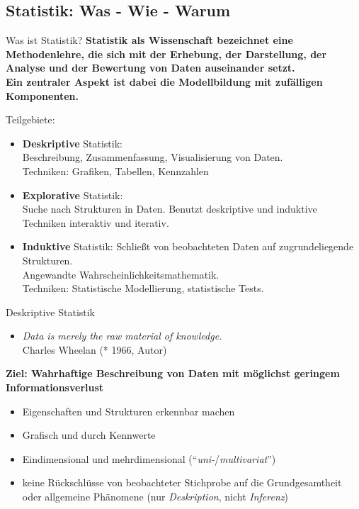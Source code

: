 \documentclass[
  10pt,
  ignorenonframetext,
]{beamer}
\providecommand{\tightlist}{%
  \setlength{\itemsep}{0pt}\setlength{\parskip}{0pt}}
\begin{document}
\subsection{Statistik: Was - Wie -
Warum}\label{statistik-was---wie---warum}

\begin{frame}{Was ist Statistik?}
\label{was-ist-statistik}
\textbf{Statistik als Wissenschaft bezeichnet eine Methodenlehre, die
sich mit der Erhebung, der Darstellung, der Analyse und der Bewertung
von Daten auseinander setzt.\\
Ein zentraler Aspekt ist dabei die Modellbildung mit zufälligen
Komponenten.}

Teilgebiete:

\begin{itemize}
\item
  \textbf{Deskriptive} Statistik:\\
  Beschreibung, Zusammenfassung, Visualisierung von Daten.\\
  Techniken: Grafiken, Tabellen, Kennzahlen
\item
  \textbf{Explorative} Statistik:\\
  Suche nach Strukturen in Daten. Benutzt deskriptive und induktive
  Techniken interaktiv und iterativ.
\item
  \textbf{Induktive} Statistik: Schließt von beobachteten Daten auf
  zugrundeliegende Strukturen.\\
  Angewandte Wahrscheinlichkeitsmathematik.\\
  Techniken: Statistische Modellierung, statistische Tests.
\end{itemize}
\end{frame}

\begin{frame}{Deskriptive Statistik}
\label{deskriptive-statistik}
\begin{itemize}[<+->]
\tightlist
\item
  \emph{Data is merely the raw material of knowledge.}\\
  Charles Wheelan (* 1966, Autor)
\end{itemize}

\textbf{Ziel: Wahrhaftige Beschreibung von Daten mit möglichst geringem
Informationsverlust}

\begin{itemize}
\tightlist
\item
  Eigenschaften und Strukturen erkennbar machen
\item
  Grafisch und durch Kennwerte
\item
  Eindimensional und mehrdimensional
  (``\emph{uni-}/\emph{multivariat}'')
\item
  keine Rückschlüsse von beobachteter Stichprobe auf die Grundgesamtheit
  oder allgemeine Phänomene (nur \emph{Deskription}, nicht
  \emph{Inferenz})
\end{itemize}
\end{frame}
\end{document}
